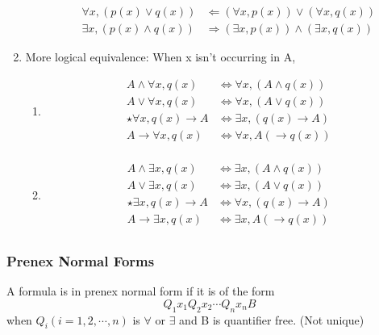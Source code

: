 \begin{enumerate}
\begin{enumerate}
        \begin{align*}
            \forall x, (p(x)\lor q(x)) &\Longleftarrow (\forall x, p(x)) \lor (\forall x, q(x))\\
            \exists x, (p(x)\land q(x)) &\Longrightarrow (\exists x, p(x)) \land (\exists x, q(x))
        \end{align*}
    \end{enumerate}
    \item More logical equivalence: When x isn't occurring in A,
    \begin{enumerate}
        \item \begin{align*}
            A\land \forall x, q(x) &\Longleftrightarrow \forall x , (A\land q(x))\\
            A\lor \forall x, q(x) &\Longleftrightarrow \forall x , (A\lor q(x))\\
            \star \forall x, q(x) \longrightarrow A &\Longleftrightarrow \exists x , (q(x)\longrightarrow A )\\
            A \longrightarrow \forall x, q(x)  &\Longleftrightarrow \forall x , A (\longrightarrow q(x) )\\
        \end{align*}
        \item \begin{align*}
            A\land \exists x, q(x) &\Longleftrightarrow \exists x , (A\land q(x))\\
            A\lor \exists x, q(x) &\Longleftrightarrow \exists x , (A\lor q(x))\\
            \star \exists x, q(x) \longrightarrow A &\Longleftrightarrow \forall x , (q(x)\longrightarrow A )\\
            A \longrightarrow \exists x, q(x)  &\Longleftrightarrow \exists x , A (\longrightarrow q(x) )\\
        \end{align*}
    \end{enumerate}
\end{enumerate}

\subsubsection{Prenex Normal Forms}
\begin{definition}
    A formula is in \textcolor{light_red}{prenex normal form} if it is of the form 
    \[ Q_1 x_1 Q_2 x_2 \cdots Q_n x_n B\]
    when $Q_i(i=1,2,\cdots,n)$ is $\forall$ or $\exists$ and B is quantifier free. (Not unique)
\end{definition}

